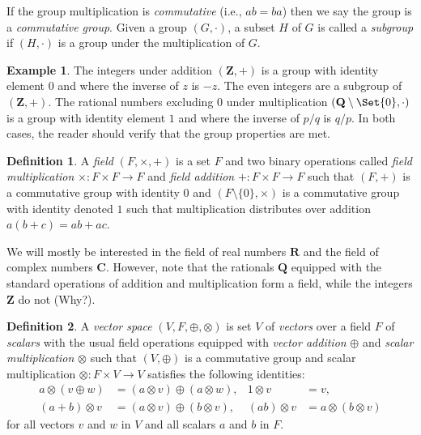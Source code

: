 \documentclass[]{article}
\theoremstyle{plain}
\theoremstyle{definition}
\newtheorem{defn}{Definition}
\newtheorem*{exmp*}{Example}
\theoremstyle{remark}
\newcommand{\reals}{\mathbf{R}}
\newcommand{\ints}{\mathbf{Z}}
\newcommand{\rationals}{\mathbf{Q}}
\newcommand{\complex}{\mathbf{C}}
\begin{document}
If the group multiplication is \emph{commutative} (i.e., $ab = ba$) then we say
the group is a \emph{commutative group}.  Given a group $(G, \cdot)$, a subset
$H$ of $G$ is called a \emph{subgroup} if $(H, \cdot)$ is a group under the
multiplication of $G$.

\begin{exmp*}
The integers under addition $(\ints, +)$ is a group with identity element $0$
and where the inverse of $z$ is $-z$.  The even integers are a subgroup of
$(\ints, +)$.  The rational numbers excluding $0$ under multiplication
$(\rationals\setminus \Set{0}, \cdot)$ is a group with identity element $1$ and
where the inverse of $p/q$ is $q/p$. In both cases, the reader should verify
that the group properties are met.
\end{exmp*}

\begin{defn}
A \emph{field} $(F, \times, +)$ is a set $F$ and two binary operations
called \emph{field multiplication} $\times: F \times F \to F$ and
\emph{field addition} $+: F \times F \to F$ such that $(F, +)$
is a commutative group with identity $0$ and $(F\setminus\{0\}, \times)$ is
a commutative group with identity denoted $1$ such that 
multiplication distributes over addition $a(b + c) = ab + ac$.
\end{defn}

We will mostly be interested in the field of real numbers $\reals$ and the
field of complex numbers $\complex$. However, note that the rationals
$\rationals$ equipped with the standard operations of addition and
multiplication form a field, while the integers $\ints$ do not (Why?).

\begin{defn}
A \emph{vector space} $(V, F, \oplus, \otimes)$ is set $V$ of \emph{vectors} over
a field $F$ of \emph{scalars} with the usual field operations equipped
with \emph{vector addition} $\oplus$ and \emph{scalar multiplication} $\otimes$ such
that $(V, \oplus)$ is a commutative group and scalar multiplication
$\otimes : F \times V \to V$ satisfies the following identities:
\begin{align*}
a\otimes(v  \oplus w) &= (a\otimes v)  \oplus (a\otimes w),  & 1\otimes v &= v, \\
(a + b)\otimes v &= (a\otimes v)  \oplus (b\otimes v), & (ab)\otimes v &= a\otimes (b\otimes v)
\end{align*}
for all vectors $v$ and $w$ in $V$ and all scalars $a$ and $b$ in $F$.
\end{defn}
\end{document}
